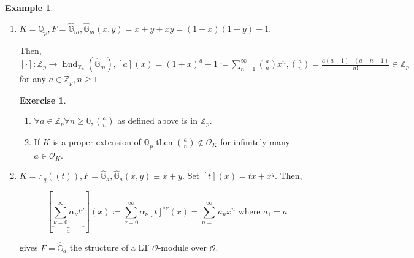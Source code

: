 \documentclass{article}
\theoremstyle{definition}
\newtheorem*{example}{Example}
\newtheorem*{exercise}{Exercise}
\numberwithin{theorem}{subsection}
\begin{document}
    \begin{example}
        \begin{enumerate}[label=\arabic*)]
            \item \(K = \mathbb{Q}_p, F = \widehat{\mathbb{G}}_m, \widehat{\mathbb{G}}_m(x,y) = x + y + xy = (1+x)(1+y)-1\).

            Then, \([\cdot]: \mathbb{Z}_p \to \operatorname{End}_{\mathbb{Z}_p}(\widehat{\mathbb{G}}_m), [a](x) = (1+x)^a - 1 \coloneqq \sum_{n=1}^{\infty} \binom{a}{n}x^n, \binom{a}{n}= \frac{a(a-1)\cdots (a-n+1)}{n!}\in \mathbb{Z}_p\) for any \(a\in \mathbb{Z}_p, n \geq 1\).

            \begin{exercise}
                \begin{enumerate}[label=\arabic*)]
                    \item \(\forall a\in \mathbb{Z}_p \forall n\geq 0, \binom{a}{n}\) as defined above is in \(\mathbb{Z}_p\).
                    \item If \(K\) is a proper extension of \(\mathbb{Q}_p\) then \(\binom{a}{n}\notin \mathcal{O}_K\) for infinitely many \(a\in \mathcal{O}_K\). 
                \end{enumerate} 
            \end{exercise}
            
            \item \(K = \mathbb{F}_q((t)), F = \widehat{\mathbb{G}}_a, \widehat{\mathbb{G}}_a(x,y) \equiv  x+y\). Set \([t](x) = tx + x^q\). Then,
            
            \[
                \left[ \underbrace{\sum_{\nu = 0}^{\infty} \alpha_\nu t^{\nu}}_{a}  \right](x) \coloneqq \sum_{\nu = 0}^{\infty} \alpha_\nu[t]^{\circ \nu}(x) = \sum_{n=1}^{\infty} a_n x^n \text{ where } a_1 = a
            \]

            gives \(F = \widehat{\mathbb{G}}_a\) the structure of a LT \(\mathcal{O}\)-module over \(\mathcal{O}\).

        \end{enumerate}
    \end{example}
\end{document}
